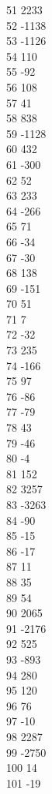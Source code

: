 { 51	2233 \\
 52	-1138 \\
 53	-1126 \\
 54	110 \\
 55	-92 \\
 56	108 \\
 57	41 \\
 58	838 \\
 59	-1128 \\
 60	432 \\
 61	-300 \\
 62	52 \\
 63	233 \\
 64	-266 \\
 65	71 \\
 66	-34 \\
 67	-30 \\
 68	138 \\
 69	-151 \\
 70	51 \\
 71	7 \\
 72	-32 \\
 73	235 \\
 74	-166 \\
 75	97 \\
 76	-86 \\
 77	-79 \\
 78	43 \\
 79	-46 \\
 80	-4 \\
 81	152 \\
 82	3257 \\
 83	-3263 \\
 84	-90 \\
 85	-15 \\
 86	-17 \\
 87	11 \\
 88	35 \\
 89	54 \\
 90	2065 \\
 91	-2176 \\
 92	525 \\
 93	-893 \\
 94	280 \\
 95	120 \\
 96	76 \\
 97	-10 \\
 98	2287 \\
 99	-2750 \\
 100	14 \\
 101	-19 \\
}
